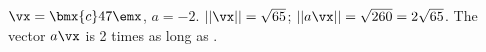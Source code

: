 {$\vx = \bmx{c} 4\\7\emx$, $a = -2$.}
{$||\vx|| = \sqrt{65}$; $||a\vx|| = \sqrt{260} = 2\sqrt{65}$. The vector $a\vx$ is 2 times as long as \vx.}